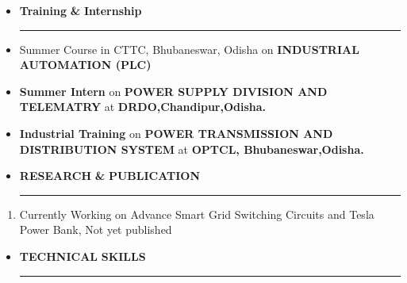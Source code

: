 \documentclass[a4paper]{article}
\begin{document}
 \renewcommand{\labelitemi}{\texttt{[image: jnj.JPG]}}
\begin{itemize}
  \vspace{4ex}
  \item \textbf{\huge{T}}\textbf{\large raining} \textbf{\huge{\&}} \textbf{\huge{I}}\textbf{\large nternship}
  {\color{mypink1}
  \rule{\linewidth}{0.5mm}}
 \end{itemize}
 
 \renewcommand{\labelitemi}{\textbullet}
 \begin{itemize}
   \item Summer Course in CTTC, Bhubaneswar, Odisha on \textbf{INDUSTRIAL AUTOMATION (PLC)}
 \item \textbf{Summer Intern} on \textbf{POWER SUPPLY DIVISION AND TELEMATRY} at \textbf{DRDO,Chandipur,Odisha.}  
      \item \textbf{Industrial Training} on \textbf{POWER TRANSMISSION AND DISTRIBUTION SYSTEM} at \textbf{OPTCL, Bhubaneswar,Odisha.}  
 \end{itemize}
 
 \renewcommand{\labelitemi}{\texttt{[image: jnj.JPG]}}
\begin{itemize}
  \vspace{4ex}
  \item \textbf{\huge{R}}\textbf{\large ESEARCH} \textbf{\LARGE{\&}} \textbf{\huge{P}}\textbf{\large UBLICATION}
  {\color{mypink1}
  \rule{\linewidth}{0.5mm}}
 \end{itemize}
 \begin{enumerate}
     \item Currently Working on Advance Smart Grid Switching Circuits and Tesla Power Bank, Not yet published
 \end{enumerate}
 
 \renewcommand{\labelitemi}{\texttt{[image: jnj.JPG]}}
\begin{itemize}
  \vspace{4ex}
  \item \textbf{\huge{T}}\textbf{\large ECHNICAL} \textbf{\huge{S}}\textbf{\large KILLS}
  {\color{mypink1}
  \rule{\linewidth}{0.5mm}}
 \end{itemize}
 
\end{document}
